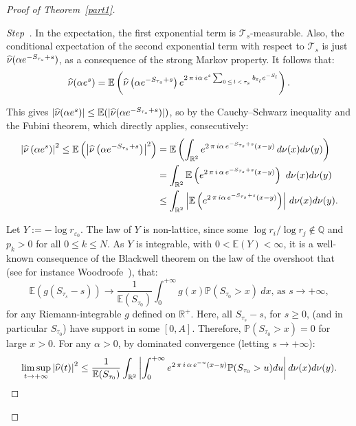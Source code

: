 \documentclass[AHL,Unicode,longabstracts,published]{cedram}
\newcommand{\Pbb}{\mathbb P}
\newcommand{\Ebb}{\mathbb E}
\newcommand{\Rbb}{\mathbb R}
\newcommand{\Qbb}{\mathbb Q}
\newcommand{\Tcl}{\mathcal{T}}
\newcounter{stepcount}
\newenvironment{step}{\refstepcounter{stepcount}\begin{proof}[Step~\thestepcount]}{\let\qed\relax\end{proof}}
\let\oldhat\hat
\renewcommand*{\hat}[1]{\mathchoice{\widehat{#1}}{\widehat{#1}}{\oldhat{#1}}{\oldhat{#1}}}
\begin{document}
\begin{proof}[{Proof of Theorem~\ref{part1}}]
\begin{step}
In the expectation, the first exponential term is ${\Tcl}_s$-measurable. Also, the conditional expectation of the second exponential term with respect to ${\Tcl}_s$ is just $\hat{\nu}(\alpha e^{-S_{\tau_s}+s})$, as a consequence of the strong Markov property. It follows that:
\[
\hat{\nu}(\alpha e^s)=\Ebb\left({\hat{\nu}\left(\alpha e^{-S_{\tau_s}+s}\right)e^{2\,\pi\,i\alpha\,e^{s}\sum_{0\,\leq\,l\,<\,\tau_s}b_{\varepsilon_l}e^{-S_l}}}\right).
\]


This gives $|\hat{\nu}(\alpha e^s)|\leq\Ebb({|\hat{\nu}(\alpha e^{-S_{\tau_s}+s})|})$, so by the Cauchy--Schwarz inequality and the Fubini theorem, which directly applies, consecutively:
\begin{align*}
\left|\hat{\nu}\left(\alpha e^s\right)\right|^2\leq\Ebb\left(\left|\hat{\nu}\left(\alpha e^{-S_{\tau_s}+s}\right)\right|^2\right)&=\Ebb\left(\int_{\Rbb^2}e^{2\,\pi\,i\alpha\,e^{-S_{\tau_s}+s}(x-y)}\,d\nu(x)d\nu(y)\right)\\
&=\int_{\Rbb^2}\Ebb\left(e^{2\,\pi\,i\,\alpha\,e^{-S_{\tau_s}+s}(x-y)}\right)~d\nu(x)d\nu(y)\\
&\leq\int_{\Rbb^2}\left|\Ebb\left({e^{2\,\pi\,i\alpha\,e^{-S_{\tau_s}+s}(x-y)}}\right)\right|\,d\nu(x)d\nu(y).
\end{align*}



Let $Y:=-\log r_{\varepsilon_0}$. The law of $Y$ is non-lattice, since some $\log r_i/\log r_j\not\in\Qbb$ and $p_k>0$ for all $0\leq k\leq N$. As $Y$ is integrable, with $0<\Ebb(Y)<\infty$, it is a well-known consequence of the Blackwell theorem on the law of the overshoot that (see for instance Woodroofe~\cite[Chapter~2, Theorem~2.3]{wood}), that:
\[
\Ebb\left(g(S_{\tau_s}-s)\right)\rightarrow \frac{1}{\Ebb(S_{\tau_0})}\int_0^{+\infty}g(x)\Pbb(S_{\tau_0}>x)~dx\text{, as }s\rightarrow+\infty,
\]
for any Riemann-integrable $g$ defined on $\Rbb^+$. Here, all $S_{\tau_s}-s$, for $s\geq0$, (and in particular $S_{\tau_0}$) have support in some $[0,A]$. Therefore, $\Pbb(S_{\tau_0}>x)=0$ for large $x>0$. For any $\alpha>0$, by dominated convergence (letting $s\rightarrow+\infty$):
\[
\limsup_{t\rightarrow+\infty}\left|\hat{\nu}(t)\right|^2\leq \frac{1}{\Ebb(S_{\tau_0})}\int_{\Rbb^2}\left|{\int_{0}^{+\infty}e^{2\,\pi\,i\,\alpha\,e^{-u}(x-y)}\Pbb(S_{\tau_0}>u)du}\right|d\nu(x)d\nu(y).
\]



\end{step}
\end{proof}
\end{document}
